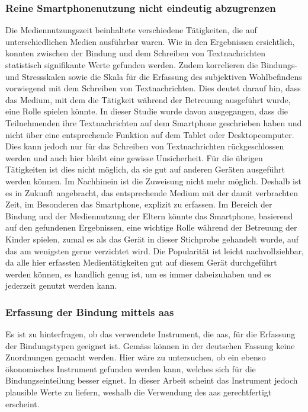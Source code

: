 \subsubsection{Reine Smartphonenutzung nicht eindeutig abzugrenzen}
Die Mediennutzungszeit beinhaltete verschiedene Tätigkeiten, die auf unterschiedlichen Medien ausführbar waren. Wie in den Ergebnissen ersichtlich, konnten zwischen der Bindung und dem Schreiben von Textnachrichten statistisch signifikante Werte gefunden werden. Zudem korrelieren die Bindungs- und Stressskalen sowie die Skala für die Erfassung des subjektiven Wohlbefindens vorwiegend mit dem Schreiben von Textnachrichten. Dies deutet darauf hin, dass das Medium, mit dem die Tätigkeit während der Betreuung ausgeführt wurde, eine Rolle spielen könnte. In dieser Studie wurde davon ausgegangen, dass die Teilnehmenden ihre Textnachrichten auf dem Smartphone geschrieben haben und nicht über eine entsprechende Funktion auf dem Tablet oder Desktopcomputer. Dies kann jedoch nur für das Schreiben von Textnachrichten rückgeschlossen werden und auch hier bleibt eine gewisse Unsicherheit. Für die übrigen Tätigkeiten ist dies nicht möglich, da sie gut auf anderen Geräten ausgeführt werden können. Im Nachhinein ist die Zuweisung nicht mehr möglich. Deshalb ist es in Zukunft angebracht, das entsprechende Medium mit der damit verbrachten Zeit, im Besonderen das Smartphone, explizit zu erfassen. Im Bereich der Bindung und der Mediennutzung der Eltern könnte das Smartphone, basierend auf den gefundenen Ergebnissen, eine wichtige Rolle während der Betreuung der Kinder spielen, zumal es als das Gerät in dieser Stichprobe gehandelt wurde, auf das am wenigsten gerne verzichtet wird. Die Popularität ist leicht nachvollziehbar, da alle hier erfassten Medientätigkeiten gut auf diesem Gerät durchgeführt werden können, es handlich genug ist, um es immer dabei\-zu\-haben und es jederzeit genutzt werden kann. 

\subsubsection{Erfassung der Bindung mittels \acrshort{aas}}
Es ist zu hinterfragen, ob das verwendete Instrument, die \acrfull{aas}, für die Erfassung der Bindungstypen geeignet ist. Gemäss  können in der deutschen Fassung keine Zuordnungen gemacht werden. Hier wäre zu untersuchen, ob ein ebenso ökonomisches Instrument gefunden werden kann, welches sich für die Bindungseinteilung besser eignet. In dieser Arbeit scheint das Instrument jedoch plausible Werte zu liefern, weshalb die Verwendung des \acrshort{aas} gerechtfertigt erscheint. 

